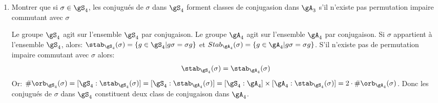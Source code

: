\begin{exercise}
\begin{enumerate}
		\item Montrer que si $\sigma\in\gS_4$, les conjugués de $\sigma$ dans $\gS_4$ forment  classes de conjugasion dans $\gA_3$ s'il n'existe pas permutation impaire commutant avec $\sigma$

		\begin{remark}
			Le groupe $\gS_4$ agit sur l'ensemble $\gS_4$ par conjugaison.
			Le groupe $\gA_4$ agit sur l'ensemble $\gA_4$ par conjugaison.
			Si $\sigma$ appartient à l'ensemble $\gS_4$, alors: $\stab_{\gS_4}(\sigma)=\{g\in\gS_4 | g\sigma=\sigma g\}$ et $Stab_{\gA_4}(\sigma)=\{g\in\gA_4 | g\sigma=\sigma g\}$. S'il n'existe pas de permutation impaire commutant avec $\sigma$ alors:
			$$\stab_{\gS_4}(\sigma)=\stab_{\gA_4}(\sigma)$$
			Or: $\#\orb_{\gS_4}(\sigma)=[\gS_4: \stab_{\gS_4}(\sigma)]=[\gS_4: \stab_{\gA_4}(\sigma)]=[\gS_4:\gA_4]\times[\gA_4: \stab_{\gS_4}(\sigma)]=2\cdot \#\orb_{\gA_4}(\sigma)$. Donc les conjugués de $\sigma$ dans $\gS_4$ constituent deux class de conjugaison dans $\gA_4$.
		\end{remark}

	\end{enumerate}
\end{exercise}

